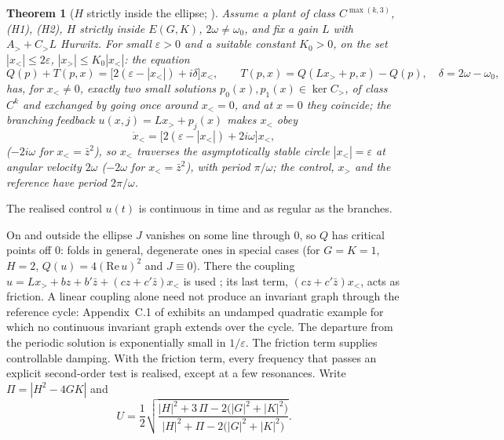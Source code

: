 \documentclass[11pt,reqno]{amsart}
\theoremstyle{plain}
\newtheorem*{theorem}{Theorem}
\theoremstyle{remark}
\theoremstyle{definition}
\begin{document}
\begin{theorem}[$H$ strictly inside the ellipse; {\cite[\S5.3]{Companion}}]
Assume a plant of class $C^{\max(k,3)}$, \textup{(H1)}, \textup{(H2)}, $H$ strictly inside $E(G,K)$,
$2\omega\ne\omega_0$, and fix a gain $L$ with $A_>+C_>L$ Hurwitz. For small $\varepsilon>0$ and a suitable constant $K_0>0$, on the set $|x_<|\le2\varepsilon$, $|x_>|\le K_0|x_<|$:
the equation
\[
  Q(p)+T(p,x)=\bigl[2(\varepsilon-|x_<|)+i\delta\bigr]x_<,\qquad T(p,x)=Q(Lx_>+p,x)-Q(p),\quad \delta=2\omega-\omega_0,
\]
has, for $x_<\ne0$, exactly two small solutions $p_0(x),p_1(x)\in\ker C_>$, of class $C^{k}$ and exchanged by going once around $x_<=0$, and at $x=0$ they coincide;
the branching feedback $u(x,j)=Lx_>+p_j(x)$ makes $x_<$ obey
\[
  \dot x_<=\bigl[2(\varepsilon-|x_<|)+2i\omega\bigr]x_< ,
\]
($-2i\omega$ for $x_<=\bar z^{2}$), so $x_<$ traverses the asymptotically stable circle $|x_<|=\varepsilon$ at angular velocity $2\omega$ ($-2\omega$ for $x_<=\bar z^{2}$), with period
$\pi/\omega$; the control, $x_>$ and the reference have period $2\pi/\omega$.
\end{theorem}

The realised control $u(t)$ is continuous in time and as regular as the branches.

On and outside the ellipse $J$ vanishes on some line through $0$, so $Q$ has critical points off $0$:
folds in general, degenerate ones in special cases (for $G=K=1$, $H=2$, $Q(u)=4(\mathrm{Re}\,u)^{2}$ and $J\equiv0$). There the coupling $u=Lx_>+bz+b'\bar z+(cz+c'\bar z)x_<$ is used
\cite[\S5.4--\S5.5]{Companion}; its last term, $(cz+c'\bar z)x_<$, acts as friction. A linear coupling alone need not produce an invariant graph through the reference cycle: Appendix~C.1 of
\cite{Companion} exhibits an undamped quadratic example for which no continuous invariant graph extends over the cycle.
The departure from the periodic solution is exponentially small in $1/\varepsilon$. The friction term supplies controllable damping. With the friction term, every frequency that passes an explicit
second-order test is realised, except at a few resonances. Write $\Pi=|H^{2}-4GK|$ and
\[
  U=\frac12\sqrt{\frac{|H|^{2}+3\,\Pi-2\bigl(|G|^{2}+|K|^{2}\bigr)}{|H|^{2}+\Pi-2\bigl(|G|^{2}+|K|^{2}\bigr)}} .
\]
\end{document}
